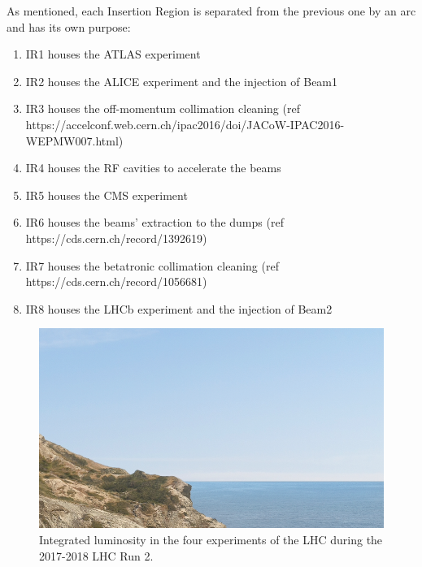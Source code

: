 As mentioned, each Insertion Region is separated from the previous one by an arc and has its own purpose:
\begin{enumerate}
    \item IR1 houses the ATLAS experiment
    \item IR2 houses the ALICE experiment and the injection of Beam1
    \item IR3 houses the off-momentum collimation cleaning (ref https://accelconf.web.cern.ch/ipac2016/doi/JACoW-IPAC2016-WEPMW007.html)
    \item IR4 houses the RF cavities to accelerate the beams
    \item IR5 houses the CMS experiment
    \item IR6 houses the beams' extraction to the dumps (ref https://cds.cern.ch/record/1392619)
    \item IR7 houses the betatronic collimation cleaning (ref https://cds.cern.ch/record/1056681)
    \item IR8 houses the LHCb experiment and the injection of Beam2
\end{enumerate}

\begin{figure}[h]
  \centering
  \includegraphics[width=0.5\columnwidth]{Figures/placeholder.png}
  \caption{Integrated luminosity in the four experiments of the LHC during the 2017-2018 LHC Run 2.}
  \label{fig:run_II_luminosities}
\end{figure}


